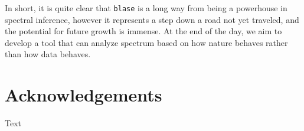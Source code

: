 \documentclass[twocolumn]{aastex631}
\begin{document}
In short, it is quite clear that \texttt{blase} is a long way from being a
powerhouse in spectral inference, however it represents a step down a road
not yet traveled, and the potential for future growth is immense. At the 
end of the day, we aim to develop a tool that can analyze spectrum based on 
how nature behaves rather than how data behaves.

\section*{Acknowledgements}
Text
\end{document}
